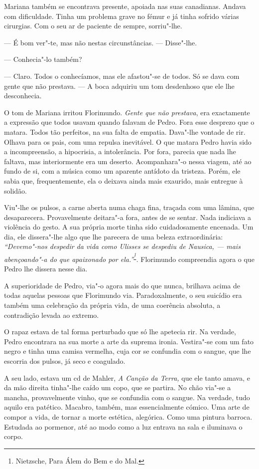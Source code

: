 Mariana também se encontrava presente, apoiada nas suas canadianas.
Andava com dificuldade. Tinha um problema grave no fémur e já tinha
sofrido várias cirurgias. Com o seu ar de paciente de sempre,
sorriu"-lhe.

--- É bom ver"-te, mas não nestas circunstâncias. --- Disse"-lhe.

--- Conhecia"-lo também?

--- Claro. Todos o conhecíamos, mas ele afastou"-se de todos. Só se dava
com gente que não prestava. --- A boca adquiriu um tom desdenhoso que ele
lhe desconhecia.

O tom de Mariana irritou Florimundo. \emph{Gente que não prestava}, era
exactamente a expressão que todos usavam quando falavam de Pedro. Fora
esse desprezo que o matara. Todos tão perfeitos, na sua falta de
empatia. Dava"-lhe vontade de rir. Olhava para os pais, com uma repulsa
inevitável. O que matara Pedro havia sido a incompreensão, a hipocrisia,
a intolerância. Por fora, parecia que nada lhe faltava, mas
interiormente era um deserto. Acompanhara"-o nessa viagem, até ao fundo
de si, com a música como um aparente antídoto da tristeza. Porém, ele
sabia que, frequentemente, ela o deixava ainda mais exaurido, mais
entregue à solidão.

Viu"-lhe os pulsos, a carne aberta numa chaga fina, traçada com uma
lâmina, que desaparecera. Provavelmente deitara"-a fora, antes de se
sentar. Nada indiciava a violência do gesto. A sua própria morte tinha
sido cuidadosamente encenada. Um dia, ele dissera"-lhe algo que lhe
parecera de uma beleza extraordinária: \emph{``Devemo"-nos despedir da
vida como Ulisses se despediu de Nausica, --- mais abençoando"-a do que
apaixonado por ela.''}\textsuperscript{\emph{\footnote{Nietzsche, Para
  Álem do Bem e do Mal.}}}\emph{. }Florimundo compreendia agora o que
Pedro lhe dissera nesse dia.

A superioridade de Pedro, via"-o agora mais do que nunca, brilhava acima
de todas aquelas pessoas que Florimundo via. Paradoxalmente, o seu
suicídio era também uma celebração da própria vida, de uma coerência
absoluta, a contradição levada ao extremo.

O rapaz estava de tal forma perturbado que só lhe apetecia rir. Na
verdade, Pedro encontrara na sua morte a arte da suprema ironia.
Vestira"-se com um fato negro e tinha uma camisa vermelha, cuja cor se
confundia com o sangue, que lhe escorria dos pulsos, já seco e
coagulado.

A seu lado, estava um cd de Mahler, \emph{A Canção da Terra, }que ele
tanto amava, e da mão direita tinha"-lhe caído um copo, que se partira.
No chão via"-se a mancha, provavelmente vinho, que se confundia com o
sangue. Na verdade, tudo aquilo era patético. Macabro, também, mas
essencialmente cómico. Uma arte de compor a vida, de tornar a morte
estética, alegórica. Como uma pintura barroca. Estudada ao pormenor, até
ao modo como a luz entrava na sala e iluminava o corpo.


